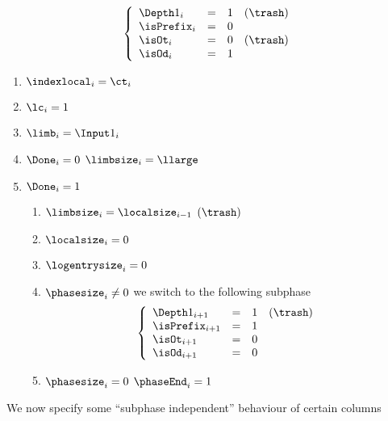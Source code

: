 \begin{description}
\begin{enumerate}[resume]
						\[
							\left\{ \begin{array}{lclr}
								\Depth 1_{i}   & = & 1 & (\trash) \\
								\isPrefix_{i}  & = & 0 &          \\
								\isOt_{i}      & = & 0 & (\trash) \\
								\isOd_{i}      & = & 1 &          \\
							\end{array} \right.
						\]
						\Then
						\begin{enumerate}
							\item $\indexlocal_{i}=\ct_{i}$
							\item $\lc_{i}=1$
							\item $\limb_{i}=\Input 1 _{i}$
							\item \If $\Done_{i} = 0 $ \Then $\limbsize_{i}=\llarge$
							\item \If $\Done_{i}=1$ \Then 
								\begin{enumerate}
									\item $\limbsize_{i}=\localsize_{i-1}$ $(\trash)$
									\item $\localsize_{i}=0$
									\item $\logentrysize_{i}=0$
									\item \If $\phasesize_{i} \neq 0$ \Then we switch to the following subphase
										\[
											\left\{ \begin{array}{lclr}
												\Depth 1_{i + 1}   & = & 1 & (\trash) \\
												\isPrefix_{i + 1}  & = & 1 &          \\
												\isOt_{i + 1}      & = & 0 &          \\
												\isOd_{i + 1}      & = & 0 &          \\
											\end{array} \right.
										\]
									\item \If $\phasesize_{i}=0$ \Then $\phaseEnd_{i}=1$
								\end{enumerate}
						\end{enumerate}
				\end{enumerate}
		\end{description}
		We now specify some ``subphase independent'' behaviour of certain columns
